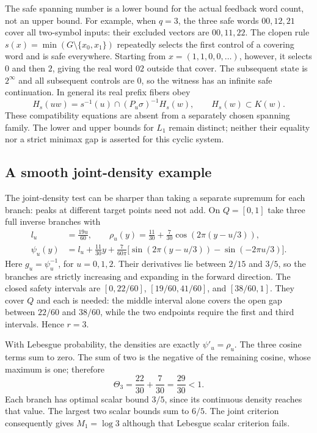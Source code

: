 \documentclass[11pt,reqno]{amsart}
\numberwithin{equation}{section}
\theoremstyle{definition}
\theoremstyle{definition}
\begin{document}
The safe spanning number is a lower bound for the actual feedback
word count, not an upper bound. For example, when $q=3$, the
three safe words $00,12,21$ cover all two-symbol inputs: their
excluded vectors are $00,11,22$. The clopen rule
$s(x)=\min(G\setminus\{x_0,x_1\})$ repeatedly selects the
first control of a covering word and is safe everywhere.
Starting from $x=(1,1,0,0,\ldots)$, however, it selects $0$
and then $2$, giving the real word $02$ outside that cover.
The subsequent state is $2^\infty$ and all subsequent controls
are $0$, so the witness has an infinite safe continuation.
In general its real prefix fibers obey
\[
 H_s(uw)=s^{-1}(u)\cap(P_u\sigma)^{-1}H_s(w),
 \qquad H_s(w)\subset K(w).
\]
These compatibility equations are absent from a separately
chosen spanning family. The lower and upper bounds for $L_1$
remain distinct; neither their equality nor a strict minimax
gap is asserted for this cyclic system.


\subsection{A smooth joint-density example}\label{subsec:smooth}
The joint-density test can be sharper than taking a separate
supremum for each branch: peaks at different target points need not
add. On $Q=[0,1]$ take three full inverse branches with
\begin{align}
 l_u&=\frac{19u}{60},\qquad
 \rho_u(y)=\frac{11}{30}+\frac7{30}
            \cos(2\pi(y-u/3)),\label{eq:smooth-rho}\\
 \psi_u(y)&=l_u+\frac{11}{30}y+
 \frac7{60\pi}\big[\sin(2\pi(y-u/3))-\sin(-2\pi u/3)\big].
 \nonumber
\end{align}
Here $g_u=\psi_u^{-1}$, for $u=0,1,2$.
Their derivatives lie between $2/15$ and $3/5$, so the branches
are strictly increasing and expanding in the forward direction.
The closed safety intervals are
$[0,22/60]$, $[19/60,41/60]$, and $[38/60,1]$.
They cover $Q$ and each is needed: the middle interval alone covers
the open gap between $22/60$ and $38/60$, while the two endpoints
require the first and third intervals. Hence $r=3$.

With Lebesgue probability, the densities are exactly
$\psi'_u=\rho_u$. The three cosine terms sum to zero. The sum of
two is the negative of the remaining cosine, whose maximum is one;
therefore
\[
 \Theta_3=\frac{22}{30}+\frac7{30}=\frac{29}{30}<1.
\]
Each branch has optimal scalar bound $3/5$, since its continuous
density reaches that value. The largest two scalar bounds sum to
$6/5$. The joint criterion consequently gives $M_1=\log3$ although
that Lebesgue scalar criterion fails.
\end{document}
